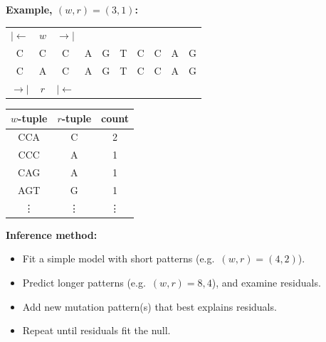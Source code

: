 \documentclass[fontscale=0.38]{baposter}
\newcommand\tLL[1]{\multicolumn{1}{|c}{#1}}
\newcommand\tRR[1]{\multicolumn{1}{c|}{#1}}
\newcommand\tLR[1]{\multicolumn{1}{|c|}{#1}}
\begin{document}
\begin{poster}
{\vspace{1em}

\textbf{Example, $(w,r)=(3,1)$:}
  \begin{center} 
    \setlength{\tabcolsep}{0pt} 
    \begin{tabular}{cccccccccc}
      $\vert\!\leftarrow$ & $w$ & $\rightarrow\!\vert$ & &&&&&& \\
      \cline{1-3}
      \tLL{C}&C&\tRR{C}&A&G&T&C&C&A&G\\
      \cline{1-1}\cline{3-3}
      C&\tLR{A}&C&A&G&T&C&C&A&G\\
      \cline{2-2}
      $\rightarrow\!\vert$ & $r$ & $\vert\!\leftarrow$ & &&&&&& \\
    \end{tabular} 
    \hspace{5em}
    \setlength{\tabcolsep}{5pt} 
    \begin{tabular}{c c c}
      $w$-tuple & $r$-tuple & count \\
      \hline
      CCA & C & 2 \\
      CCC & A & 1 \\
      CAG & A & 1 \\
      AGT & G & 1 \\
      \vdots & \vdots & \vdots \\
      \hline
    \end{tabular}
  \end{center} 

  \vspace{1em}

  \textbf{Inference method:}
  \begin{itemize}
    \item Fit a simple model with short patterns (e.g.\ $(w,r)=(4,2)$).
    \item Predict longer patterns (e.g.\ $(w,r)=8,4$), and examine residuals.
    \item Add new mutation pattern(s) that best explains residuals.
    \item Repeat until residuals fit the null.
  \end{itemize}


}




\end{poster}
\end{document}
